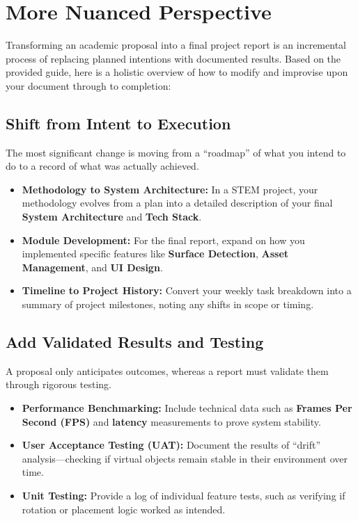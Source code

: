 \documentclass{tietreport}
\begin{document}
\section{More Nuanced Perspective}

Transforming an academic proposal into a final project
report is an incremental process of replacing planned
intentions with documented results. Based on the
provided guide, here is a holistic overview of how to
modify and improvise upon your document through to
completion:

\subsection{Shift from Intent to Execution}

The most significant change is moving from a
``roadmap'' of what you intend to do to a record of
what was actually achieved.

\begin{itemize}
\item \textbf{Methodology to System Architecture:} In a
  STEM project, your methodology evolves from a plan
  into a detailed description of your final
  \textbf{System Architecture} and \textbf{Tech Stack}.
\item \textbf{Module Development:} For the final
  report, expand on how you implemented specific
  features like \textbf{Surface Detection},
  \textbf{Asset Management}, and \textbf{UI Design}.
\item \textbf{Timeline to Project History:} Convert
  your weekly task breakdown into a summary of project
  milestones, noting any shifts in scope or timing.
\end{itemize}

\subsection{Add Validated Results and Testing}

A proposal only anticipates outcomes, whereas a report
must validate them through rigorous testing.

\begin{itemize}
\item \textbf{Performance Benchmarking:} Include
  technical data such as \textbf{Frames Per Second
    (FPS)} and \textbf{latency} measurements to prove
  system stability.
\item \textbf{User Acceptance Testing (UAT):} Document
  the results of ``drift'' analysis---checking if
  virtual objects remain stable in their environment
  over time.
\item \textbf{Unit Testing:} Provide a log of
  individual feature tests, such as verifying if
  rotation or placement logic worked as intended.
\end{itemize}
\end{document}
